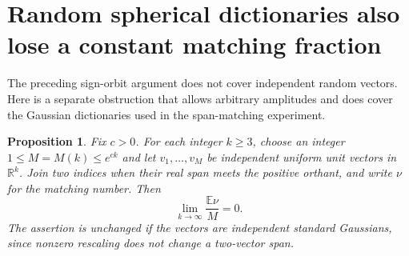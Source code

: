 \documentclass[11pt]{article}
\newtheorem{proposition}{Proposition}
\begin{document}
\section{Random spherical dictionaries also lose a constant matching fraction}

The preceding sign-orbit argument does not cover independent random vectors.
Here is a separate obstruction that allows arbitrary amplitudes and does cover
the Gaussian dictionaries used in the span-matching experiment.

\begin{proposition}
Fix $c>0$. For each integer $k\geq3$, choose an integer
$1\leq M=M(k)\leq e^{ck}$ and let $v_1,\ldots,v_M$ be independent
uniform unit vectors in $\mathbb R^k$.
Join two indices when their real span meets the positive orthant, and
write $\nu$ for the matching number. Then
\[
 \lim_{k\to\infty}\frac{\mathbb E\nu}{M}=0.
\]
The assertion is unchanged if the vectors are independent standard
Gaussians, since nonzero rescaling does not change a two-vector span.
\end{proposition}
\end{document}
